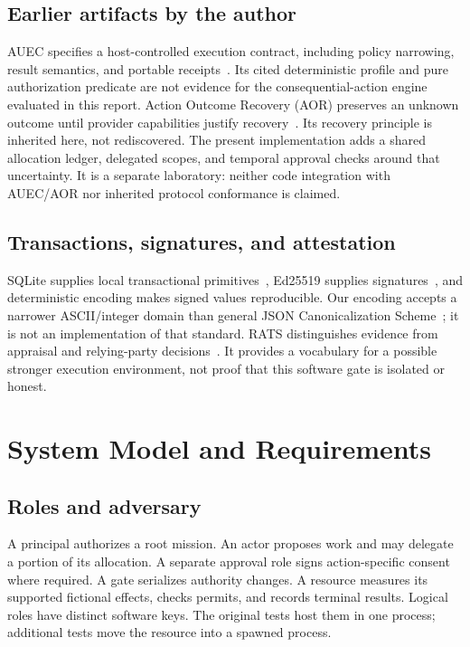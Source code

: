 \documentclass[10pt,journal,a4paper]{IEEEtran}
\begin{document}
\subsection{Earlier artifacts by the author}
AUEC specifies a host-controlled execution contract, including policy narrowing, result semantics, and portable receipts~\cite{auec}. Its cited deterministic profile and pure authorization predicate are not evidence for the consequential-action engine evaluated in this report. Action Outcome Recovery (AOR) preserves an unknown outcome until provider capabilities justify recovery~\cite{aor}. Its recovery principle is inherited here, not rediscovered. The present implementation adds a shared allocation ledger, delegated scopes, and temporal approval checks around that uncertainty. It is a separate laboratory: neither code integration with AUEC/AOR nor inherited protocol conformance is claimed.

\subsection{Transactions, signatures, and attestation}
SQLite supplies local transactional primitives~\cite{sqlatomic,sqlwal}, Ed25519 supplies signatures~\cite{eddsa}, and deterministic encoding makes signed values reproducible. Our encoding accepts a narrower ASCII/integer domain than general JSON Canonicalization Scheme~\cite{jcs}; it is not an implementation of that standard. RATS distinguishes evidence from appraisal and relying-party decisions~\cite{rats}. It provides a vocabulary for a possible stronger execution environment, not proof that this software gate is isolated or honest.

\section{System Model and Requirements}
\subsection{Roles and adversary}
A principal authorizes a root mission. An actor proposes work and may delegate a portion of its allocation. A separate approval role signs action-specific consent where required. A gate serializes authority changes. A resource measures its supported fictional effects, checks permits, and records terminal results. Logical roles have distinct software keys. The original tests host them in one process; additional tests move the resource into a spawned process.
\end{document}
